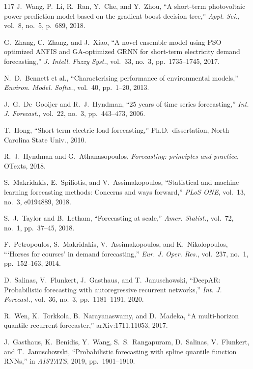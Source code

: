 \documentclass[12pt,a4paper]{article}
\begin{document}
\begin{thebibliography}{117}
 J.~Wang, P.~Li, R.~Ran, Y.~Che, and Y.~Zhou, ``A short-term photovoltaic power prediction model based on the gradient boost decision tree,'' \textit{Appl. Sci.}, vol.~8, no.~5, p.~689, 2018.

 G.~Zhang, C.~Zhang, and J.~Xiao, ``A novel ensemble model using PSO-optimized ANFIS and GA-optimized GRNN for short-term electricity demand forecasting,'' \textit{J. Intell. Fuzzy Syst.}, vol.~33, no.~3, pp.~1735--1745, 2017.

 N.~D.~Bennett et al., ``Characterising performance of environmental models,'' \textit{Environ. Model. Softw.}, vol.~40, pp.~1--20, 2013.

 J.~G.~De~Gooijer and R.~J.~Hyndman, ``25 years of time series forecasting,'' \textit{Int. J. Forecast.}, vol.~22, no.~3, pp.~443--473, 2006.

 T.~Hong, ``Short term electric load forecasting,'' Ph.D.\ dissertation, North Carolina State Univ., 2010.

 R.~J.~Hyndman and G.~Athanasopoulos, \textit{Forecasting: principles and practice}, OTexts, 2018.

 S.~Makridakis, E.~Spiliotis, and V.~Assimakopoulos, ``Statistical and machine learning forecasting methods: Concerns and ways forward,'' \textit{PLoS ONE}, vol.~13, no.~3, e0194889, 2018.

 S.~J.~Taylor and B.~Letham, ``Forecasting at scale,'' \textit{Amer. Statist.}, vol.~72, no.~1, pp.~37--45, 2018.

 F.~Petropoulos, S.~Makridakis, V.~Assimakopoulos, and K.~Nikolopoulos, ```Horses for courses' in demand forecasting,'' \textit{Eur. J. Oper. Res.}, vol.~237, no.~1, pp.~152--163, 2014.

 D.~Salinas, V.~Flunkert, J.~Gasthaus, and T.~Januschowski, ``DeepAR: Probabilistic forecasting with autoregressive recurrent networks,'' \textit{Int. J. Forecast.}, vol.~36, no.~3, pp.~1181--1191, 2020.

 R.~Wen, K.~Torkkola, B.~Narayanaswamy, and D.~Madeka, ``A multi-horizon quantile recurrent forecaster,'' arXiv:1711.11053, 2017.

 J.~Gasthaus, K.~Benidis, Y.~Wang, S.~S.~Rangapuram, D.~Salinas, V.~Flunkert, and T.~Januschowski, ``Probabilistic forecasting with spline quantile function RNNs,'' in \textit{AISTATS}, 2019, pp.~1901--1910.


\end{thebibliography}
\end{document}
